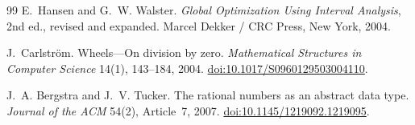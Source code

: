 \documentclass[11pt,a4paper]{article}
\theoremstyle{paperdef}
\begin{document}
\begin{thebibliography}{99}
E.~Hansen and G.~W. Walster.
\newblock \emph{Global Optimization Using Interval Analysis}, 2nd ed.,
revised and expanded.
\newblock Marcel Dekker / CRC Press, New York, 2004.

J.~Carlstr\"om.
\newblock Wheels---On division by zero.
\newblock \emph{Mathematical Structures in Computer Science} 14(1),
143--184, 2004.
\newblock \href{https://doi.org/10.1017/S0960129503004110}{doi:10.1017/S0960129503004110}.

J.~A. Bergstra and J.~V. Tucker.
\newblock The rational numbers as an abstract data type.
\newblock \emph{Journal of the ACM} 54(2), Article~7, 2007.
\newblock \href{https://doi.org/10.1145/1219092.1219095}{doi:10.1145/1219092.1219095}.

\end{thebibliography}
\end{document}
